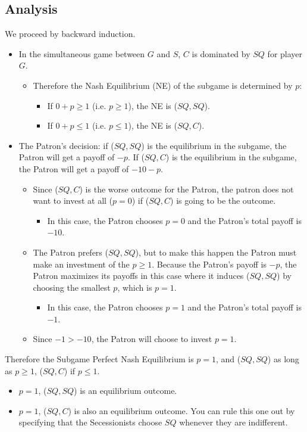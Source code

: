 \documentclass[12pt]{article}
\begin{document}
\subsection{Analysis}
We proceed by backward induction.
\begin{itemize}
	\item In the simultaneous game between $G$ and $S$, $C$ is dominated by $SQ$ for player $G$.
		\begin{itemize}
			\item Therefore the Nash Equilibrium (NE) of the subgame is determined by $p$: 
				\begin{itemize}
					\item If $0+p \geq 1$ (i.e. $p \geq 1$), the NE is ($SQ,SQ$).
					\item If $0+p \leq 1$ (i.e. $p \leq 1$), the NE is ($SQ,C$).
				\end{itemize}
		\end{itemize}
	\item The Patron's decision: if ($SQ,SQ$) is the equilibrium in the subgame, the Patron will get a payoff of $-p$. If ($SQ,C$) is the equilibrium in the subgame, the Patron will get a payoff of $-10-p$.
		\begin{itemize}
			\item Since ($SQ,C$) is the worse outcome for the Patron, the patron does not want to invest at all ($p=0$) if ($SQ,C$) is going to be the outcome. 
				\begin{itemize}
					\item In this case, the Patron chooses $p=0$ and the Patron's total payoff is $-10$.
				\end{itemize}
			\item The Patron prefers ($SQ,SQ$), but to make this happen the Patron must make an investment of the $p \geq 1$. Because the Patron's payoff is $-p$, the Patron maximizes its payoffs in this case where it induces ($SQ,SQ$) by choosing the smallest $p$, which is $p=1$. 
				\begin{itemize}
					\item In this case, the Patron chooses $p=1$ and the Patron's total payoff is $-1$.
				\end{itemize}
			\item Since $-1 > -10$, the Patron will choose to invest $p=1$.
		\end{itemize}
\end{itemize}
Therefore the Subgame Perfect Nash Equilibrium is $p=1$, and ($SQ,SQ$) as long as $p \geq 1$, ($SQ,C$) if $p \leq 1$.
\begin{itemize}
	\item $p=1$, ($SQ,SQ$) is an equilibrium outcome.
	\item $p=1$, ($SQ,C$) is also an equilibrium outcome. You can rule this one out by specifying that the Secessionists choose $SQ$ whenever they are indifferent.
\end{itemize}
\end{document}
